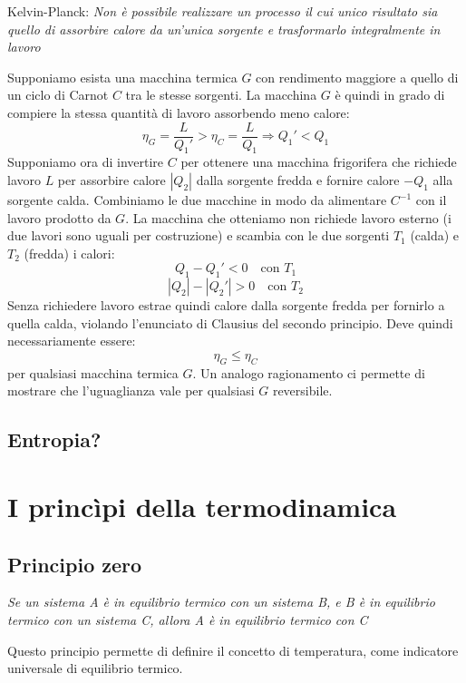 \documentclass{article}
\begin{document}
\begin{center}
    Kelvin-Planck: \textit{Non è possibile realizzare un processo il cui unico risultato sia quello di assorbire calore da un'unica sorgente e trasformarlo integralmente in lavoro}
\end{center}
Supponiamo esista una macchina termica $G$ con rendimento maggiore a quello di un ciclo di Carnot $C$ tra le stesse sorgenti. La macchina $G$ è quindi in grado di compiere la stessa quantità di lavoro assorbendo meno calore:
$$ \eta_G=\frac{L}{Q_1'}>\eta_C=\frac{L}{Q_1} \Rightarrow Q_1'<Q_1$$
Supponiamo ora di invertire $C$ per ottenere una macchina frigorifera che richiede lavoro $L$ per assorbire calore $|Q_2|$ dalla sorgente fredda e fornire calore $-Q_1$ alla sorgente calda. Combiniamo le due macchine in modo da alimentare $C^{-1}$ con il lavoro prodotto da $G$. La macchina che otteniamo non richiede lavoro esterno (i due lavori sono uguali per costruzione) e scambia con le due sorgenti $T_1$ (calda) e $T_2$ (fredda) i calori:
$$ Q_1 - Q_1' < 0 \quad\text{con $T_1$} $$
$$ |Q_2|-|Q_2'| > 0 \quad\text{con $T_2$} $$
Senza richiedere lavoro estrae quindi calore dalla sorgente fredda per fornirlo a quella calda, violando l'enunciato di Clausius del secondo principio. Deve quindi necessariamente essere:
$$  \eta_G\leq\eta_C $$
per qualsiasi macchina termica $G$. Un analogo ragionamento ci permette di mostrare che l'uguaglianza vale per qualsiasi $G$ reversibile.

\subsection{Entropia?}




\newpage
\section{I princìpi della termodinamica}

\subsection{Principio zero}
\begin{center}
    \textit{Se un sistema A è in equilibrio termico con un sistema B, e B è in equilibrio termico con un sistema C, allora A è in equilibrio termico con C}
\end{center}
Questo principio permette di definire il concetto di temperatura, come indicatore universale di equilibrio termico.
\end{document}
